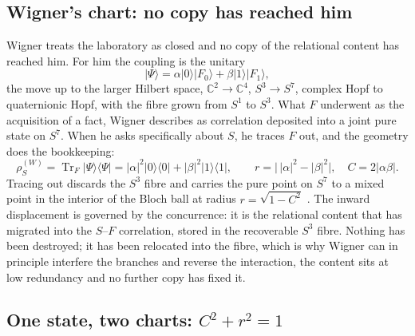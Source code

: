 \subsection{Wigner's chart: no copy has reached him}
\label{sec:wf-wigner}

Wigner treats the laboratory as closed and no copy of the relational content has
reached him. For him the coupling is the unitary
\begin{equation}
  \lvert\Psi\rangle
  =\alpha\lvert 0\rangle\lvert F_{0}\rangle
  +\beta\lvert 1\rangle\lvert F_{1}\rangle,
\end{equation}
the move up to the larger Hilbert space, $\mathbb{C}^{2}\to\mathbb{C}^{4}$,
$S^{3}\to S^{7}$, complex Hopf to quaternionic Hopf, with the fibre grown from
$S^{1}$ to $S^{3}$. What $F$ underwent as the acquisition of a fact, Wigner
describes as correlation deposited into a joint pure state on $S^{7}$. When he
asks specifically about $S$, he traces $F$ out, and the geometry does the
bookkeeping:
\begin{equation}
  \rho_{S}^{(W)}=\operatorname{Tr}_{F}\lvert\Psi\rangle\langle\Psi\rvert
  =\lvert\alpha\rvert^{2}\lvert 0\rangle\langle 0\rvert
  +\lvert\beta\rvert^{2}\lvert 1\rangle\langle 1\rvert,
  \qquad
  r=\bigl\lvert\,\lvert\alpha\rvert^{2}-\lvert\beta\rvert^{2}\bigr\rvert,
  \quad
  C=2\lvert\alpha\beta\rvert .
\end{equation}
Tracing out discards the $S^{3}$ fibre and carries the pure point on $S^{7}$ to a
mixed point in the interior of the Bloch ball at radius $r=\sqrt{1-C^{2}}$
\autocite{mosseri2001hopf}. The inward displacement is governed by the
concurrence: it is the relational content that has migrated into the $S$--$F$
correlation, stored in the recoverable $S^{3}$ fibre. Nothing has been destroyed;
it has been relocated into the fibre, which is why Wigner can in principle
interfere the branches and reverse the interaction, the content sits at low
redundancy and no further copy has fixed it.

\subsection{One state, two charts: \texorpdfstring{$C^{2}+r^{2}=1$}{C2+r2=1}}
\label{sec:wf-reconciliation}

